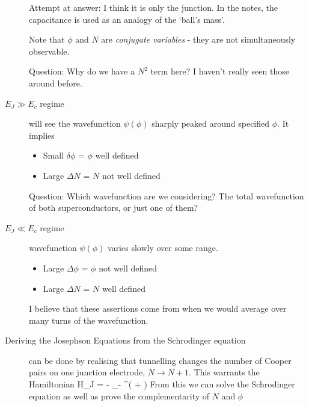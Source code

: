 \begin{description}
Attempt at answer: I think it is only the junction. In the notes, the capacitance is used as an analogy of the `ball's mass'. 

Note that $\phi$ and $N$ are \emph{conjugate variables} - they are not simultaneously observable. 

Question: Why do we have a $N^2$ term here? I haven't really seen those around before. 




\item[$E_J \gg 	E_c$ regime] will see the wavefunction $\psi(\phi)$ sharply peaked around specified $\phi$. It implies
\begin{itemize}
\item Small $\delta \phi$ = $\phi$ well defined
\item Large $\Delta N$ = $N$ not well defined
\end{itemize}


Question: Which wavefunction are we considering? The total wavefunction of both superconductors, or just one of them? 

\item[$E_J \ll E_c$ regime] wavefunction $\psi(\phi)$ varies slowly over  some range. 
\begin{itemize}
\item Large $\Delta \phi$ = $\phi$ not well defined
\item Large $\Delta N$ = $N$ well defined
\end{itemize}
I believe that these assertions come from when we would average over many turns of the wavefunction. 

\item[Deriving the Josephson Equations from the Schrodinger equation] can be done by realising that tunnelling changes the number of Cooper pairs on one junction electrode, $N \rightarrow N + 1$. This warrants the Hamiltonian
\beq
H_J = -  \sum_{- \infty}^\infty \left(   +   \right)
\eeq
From this we can solve the Schrodinger equation as well as prove the complementarity of $N$ and $\phi$

\end{description}

